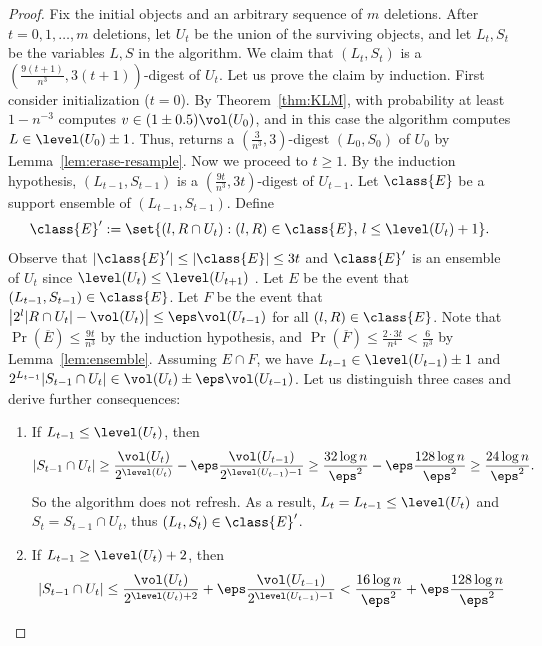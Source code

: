 %
\begin{proof}
    Fix the initial objects and an arbitrary sequence of $m$ deletions. After $t = 0, 1, \dots, m$ deletions, let $U_t$ be the union of the surviving objects, and let $L_t,S_t$ be the variables $L,S$ in the algorithm. We claim that $(L_t,S_t)$ is a $(\frac{9(t+1)}{n^3}, 3(t+1))$-digest of $U_t$.
%
    Let us prove the claim by induction. First consider initialization ($t = 0$). By Theorem~\ref{thm:KLM}, with probability at least $1 - n^{-3}$ \KLM computes $v \in (1 \pm 0.5) \vol(U_0)$, and in this case the algorithm computes $L \in \level(U_0) \pm 1$. Thus, \resample returns a $(\frac{3}{n^3},3)$-digest $(L_0,S_0)$ of $U_0$ by Lemma~\ref{lem:erase-resample}.
%
    Now we proceed to $t \geq 1$. By the induction hypothesis, $(L_{t-1},S_{t-1})$ is a $(\frac{9t}{n^3}, 3t)$-digest of $U_{t-1}$. Let $\class{E}$ be a support ensemble of $(L_{t-1}, S_{t-1})$. Define
    \[
        \class{E}' := \set{(l,R \cap U_t) : (l,R) \in \class{E},\, l \leq \level(U_t)+1 }.
    \]
    Observe that $|\class{E}'| \leq |\class{E}| \leq 3t$ and $\class{E}'$ is an ensemble of $U_t$ since $\level(U_t) \leq \level(U_{t+1})$ .
%
    Let $E$ be the event that $(L_{t-1}, S_{t-1}) \in \class{E}$. Let $F$ be the event that $\left| 2^l |R \cap U_t| - \vol(U_t) \right| \leq \eps \vol(U_{t-1})$ for all $(l,R) \in \class{E}$. Note that $\Pr(\overline{E}) \leq \frac{9t}{n^3}$ by the induction hypothesis, and $\Pr(\overline{F}) \leq \frac{2 \cdot 3t}{n^4} < \frac{6}{n^3}$ by Lemma~\ref{lem:ensemble}.
%
    Assuming $E \cap F$, we have $L_{t-1} \in \level(U_{t-1}) \pm 1$ and $2^{L_{t-1}} |S_{t-1} \cap U_t| \in \vol(U_t)\pm\eps \vol(U_{t-1})$. Let us distinguish three cases and derive further consequences:
    \begin{enumerate}[label={(\arabic*)}]
        \item If $L_{t-1} \leq \level(U_t)$, then
        \[
            |S_{t-1} \cap U_t|
            \geq \frac{\vol(U_t)}{2^{\level(U_t)}} - \eps \frac{\vol(U_{t-1})}{2^{\level(U_{t-1})-1}}
            \geq \frac{32 \log n}{\eps^2} - \eps \frac{128 \log n}{\eps^2}
            \geq \frac{24 \log n}{\eps^2}.
        \]
        So the algorithm does not refresh. As a result, $L_t = L_{t-1} \leq \level(U_t)$ and $S_t = S_{t-1} \cap U_t$, thus $(L_t, S_t) \in \class{E}'$.
%
        \item If $L_{t-1} \geq \level(U_t) + 2$, then
        \[
            |S_{t-1} \cap U_t|
            \leq \frac{\vol(U_t)}{2^{\level(U_t)+2}} + \eps \frac{\vol(U_{t-1})}{2^{\level(U_{t-1})-1}}
            < \frac{16 \log n}{\eps^2} + \eps \frac{128 \log n}{\eps^2}
\]
\end{enumerate}
\end{proof}
